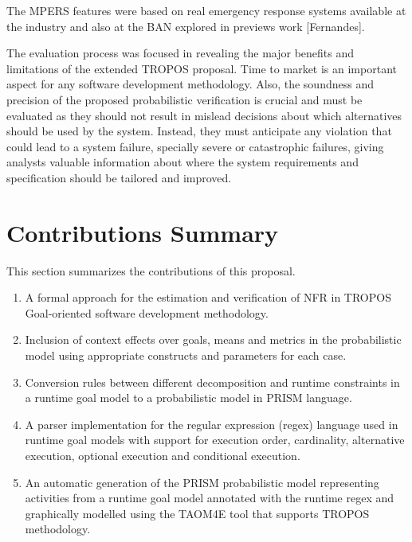 The MPERS features were based on real emergency response systems available at the industry and also at the BAN explored in previews work [Fernandes]. 

The evaluation process was focused in revealing the major benefits and limitations of the extended TROPOS proposal. Time to market is an important aspect for any software development methodology. Also, the soundness and precision of the proposed probabilistic verification is crucial and must be evaluated as they should not result in mislead decisions about which alternatives should be used by the system. Instead, they must anticipate any violation that could lead to a system failure, specially severe or catastrophic failures, giving analysts valuable information about where the system requirements and specification should be tailored and improved.

\section{Contributions Summary}

This section summarizes the contributions of this proposal.


\begin{enumerate}

\item A formal approach for the estimation and verification of NFR in TROPOS Goal-oriented software development methodology.
\medskip

\item Inclusion of context effects over goals, means and metrics in the probabilistic model using appropriate constructs and parameters for each case.
\medskip

\item Conversion rules between different decomposition and runtime constraints in a runtime goal model to a probabilistic model in PRISM language.
\medskip

\item A parser implementation for the regular expression (regex) language used in runtime goal models with support for execution order, cardinality, alternative execution, optional execution and conditional execution. 
\medskip

\item An automatic generation of the PRISM probabilistic model representing activities from a runtime goal model annotated with the runtime regex and graphically modelled using the TAOM4E tool that supports TROPOS methodology.

\end{enumerate}

